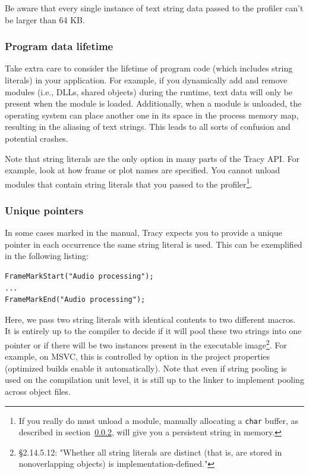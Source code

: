 \documentclass[hidelinks,titlepage,a4paper,twoside]{article}
\begin{document}
Be aware that every single instance of text string data passed to the profiler can't be larger than 64 KB.

\subsubsection{Program data lifetime}
\label{datalifetime}

Take extra care to consider the lifetime of program code (which includes string literals) in your application. For example, if you dynamically add and remove modules (i.e., DLLs, shared objects) during the runtime, text data will only be present when the module is loaded. Additionally, when a module is unloaded, the operating system can place another one in its space in the process memory map, resulting in the aliasing of text strings. This leads to all sorts of confusion and potential crashes.

Note that string literals are the only option in many parts of the Tracy API. For example, look at how frame or plot names are specified. You cannot unload modules that contain string literals that you passed to the profiler\footnote{If you really do must unload a module, manually allocating a \texttt{char} buffer, as described in section~\ref{uniquepointers}, will give you a persistent string in memory.}.

\subsubsection{Unique pointers}
\label{uniquepointers}

In some cases marked in the manual, Tracy expects you to provide a unique pointer in each occurrence the same string literal is used. This can be exemplified in the following listing:

\begin{lstlisting}
FrameMarkStart("Audio processing");
...
FrameMarkEnd("Audio processing");
\end{lstlisting}

Here, we pass two string literals with identical contents to two different macros. It is entirely up to the compiler to decide if it will pool these two strings into one pointer or if there will be two instances present in the executable image\footnote{\cite{ISO:2012:III} \S 2.14.5.12: "Whether all string literals are distinct (that is, are stored in nonoverlapping objects) is implementation-defined."}. For example, on MSVC, this is controlled by  option in the project properties (optimized builds enable it automatically). Note that even if string pooling is used on the compilation unit level, it is still up to the linker to implement pooling across object files.
\end{document}
